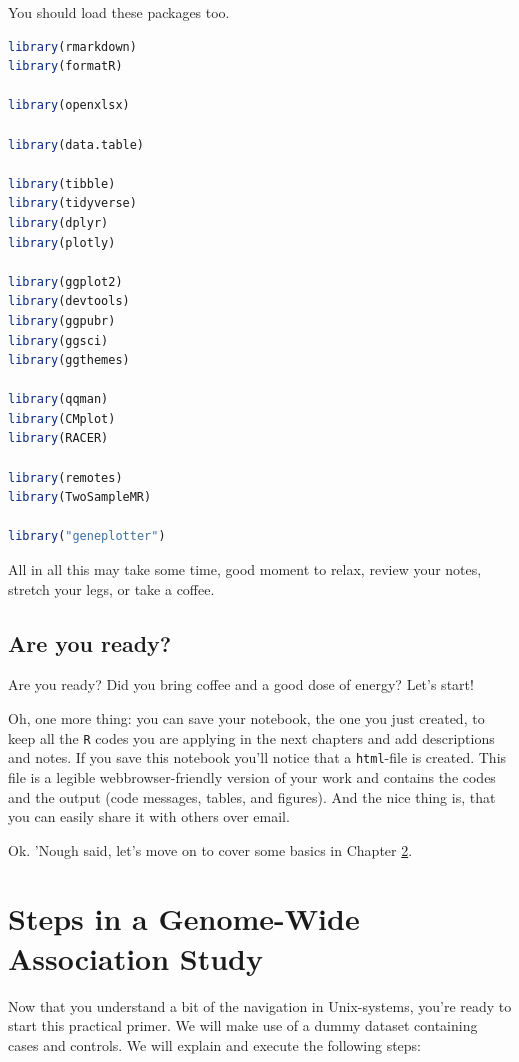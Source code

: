 \documentclass[
]{book}
\newcommand{\passthrough}[1]{#1}
\begin{document}
You should load these packages too.

\begin{lstlisting}[language=R]
library(rmarkdown)
library(formatR)

library(openxlsx)

library(data.table)

library(tibble)
library(tidyverse)
library(dplyr)
library(plotly)

library(ggplot2)
library(devtools)
library(ggpubr)
library(ggsci)
library(ggthemes)

library(qqman)
library(CMplot)
library(RACER)

library(remotes)
library(TwoSampleMR)

library("geneplotter")
\end{lstlisting}

All in all this may take some time, good moment to relax, review your notes, stretch your legs, or take a coffee.

\hypertarget{are-you-ready}{%
\section{Are you ready?}\label{are-you-ready}}

Are you ready? Did you bring coffee and a good dose of energy? Let's start!

Oh, one more thing: you can save your notebook, the one you just created, to keep all the \passthrough{\lstinline!R!} codes you are applying in the next chapters and add descriptions and notes. If you save this notebook you'll notice that a \passthrough{\lstinline!html!}-file is created. This file is a legible webbrowser-friendly version of your work and contains the codes and the output (code messages, tables, and figures). And the nice thing is, that you can easily share it with others over email.

Ok. 'Nough said, let's move on to cover some basics in Chapter \ref{gwas-basics}.

\hypertarget{gwas-basics}{%
\chapter{Steps in a Genome-Wide Association Study}\label{gwas-basics}}

Now that you understand a bit of the navigation in Unix-systems, you're ready to start this practical primer. We will make use of a dummy dataset containing cases and controls. We will explain and execute the following steps:
\end{document}
